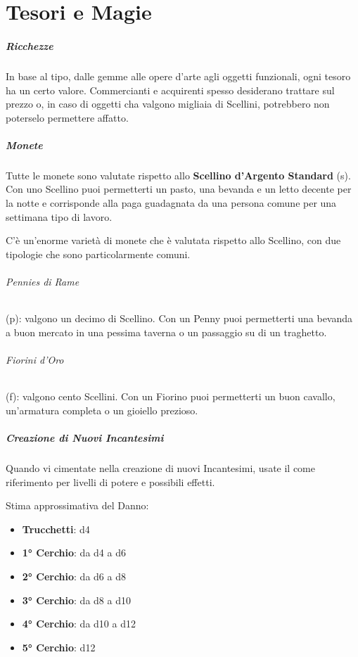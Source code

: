 \documentclass[itdr]{subfiles}
\begin{document}
\chapter{Tesori e Magie}
\label{ch:tesori_e_magie}

\paragraph{Ricchezze}
In base al tipo, dalle gemme alle opere d'arte agli oggetti funzionali, ogni tesoro ha un certo valore. Commercianti e acquirenti spesso desiderano trattare sul prezzo o, in caso di oggetti cha valgono migliaia di Scellini, potrebbero non poterselo permettere affatto.

\vfill

\paragraph{Monete}
Tutte le monete sono valutate rispetto allo \textbf{Scellino d'Argento Standard} (s). Con uno Scellino puoi permetterti un pasto, una bevanda e un letto decente per la notte e corrisponde alla paga guadagnata da una persona comune per una settimana tipo di lavoro.

C'è un'enorme varietà di monete che è valutata rispetto allo Scellino, con due tipologie che sono particolarmente comuni.

\subparagraph{Pennies di Rame} (p): valgono un decimo di Scellino. Con un Penny puoi permetterti una bevanda a buon mercato in una pessima taverna o un passaggio su di un traghetto.

\subparagraph{Fiorini d'Oro} (f): valgono cento Scellini. Con un Fiorino puoi permetterti un buon cavallo, un'armatura completa o un gioiello prezioso.

\vfill

\paragraph{Creazione di Nuovi Incantesimi}
Quando vi cimentate nella creazione di nuovi Incantesimi, usate il \textbf{} come riferimento per livelli di potere e possibili effetti.

Stima approssimativa del Danno:
\begin{itemize}
	\item \textbf{Trucchetti}: d4
	\item \textbf{1° Cerchio}: da d4 a d6
	\item \textbf{2° Cerchio}: da d6 a d8
	\item \textbf{3° Cerchio}: da d8 a d10
	\item \textbf{4° Cerchio}: da d10 a d12
	\item \textbf{5° Cerchio}: d12
\end{itemize}
\end{document}
